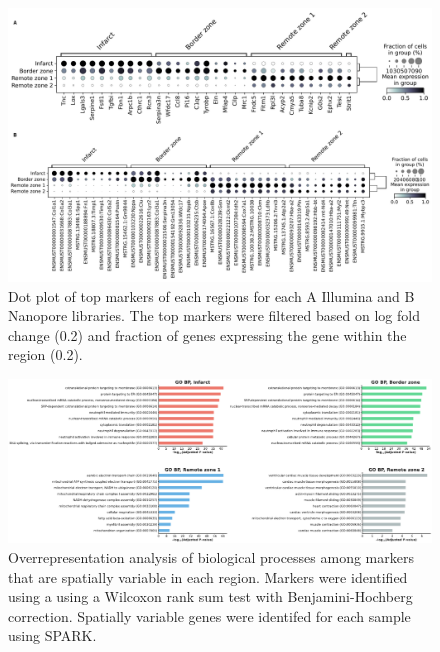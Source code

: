 \documentclass[utf8]{frontiers_suppmat} %
\begin{document}
\begin{figure}[htbp]
\begin{center}
\includegraphics[width=\textwidth]{figS5}%
\end{center}
\caption{Dot plot of top markers of each regions for each A Illumina and B Nanopore libraries. The top markers were filtered based on log fold change (0.2) and fraction of genes expressing the gene within the region (0.2).}\label{fig:S5}
\end{figure}

\begin{figure}[htbp]
\begin{center}
\includegraphics[width=\textwidth]{figS6}%
\end{center}
\caption{Overrepresentation analysis of biological processes among markers that are spatially variable in each region. Markers were identified using a using a Wilcoxon rank sum test with Benjamini-Hochberg correction. Spatially variable genes were identifed for each sample using SPARK.}\label{fig:S6}
\end{figure}
\end{document}
